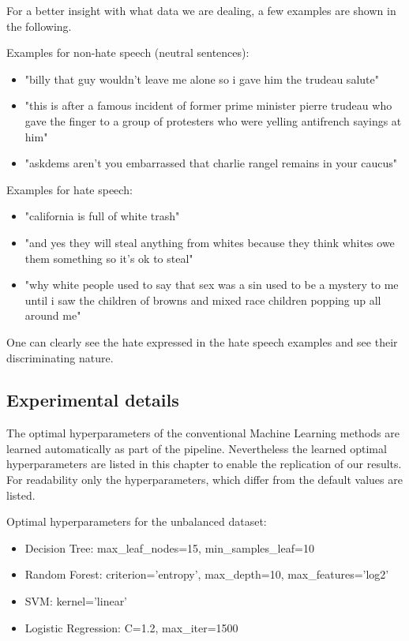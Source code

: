 For a better insight with what data we are dealing, a few examples are shown in the following.

\noindent
Examples for non-hate speech (neutral sentences):
\begin{itemize}
    \item "billy that guy wouldn't leave me alone so i gave him the trudeau salute"
    \item "this is after a famous incident of former prime minister pierre trudeau who gave the finger to a group of protesters who were yelling antifrench sayings at him"
    \item "askdems aren't you embarrassed that charlie rangel remains in your caucus"
\end{itemize}

\noindent
Examples for hate speech:
\begin{itemize}
    \item "california is full of white trash"
    \item "and yes they will steal anything from whites because they think whites owe them something so it's ok to steal"
    \item "why white people used to say that sex was a sin used to be a mystery to me until i saw the children of browns and mixed race children popping up all around me"
\end{itemize}

One can clearly see the hate expressed in the hate speech examples and see their discriminating nature.

\subsection{Experimental details}


The optimal hyperparameters of the conventional Machine Learning methods are learned automatically as part of the pipeline. Nevertheless the learned optimal hyperparameters are listed in this chapter to enable the replication of our results. For readability only the hyperparameters, which differ from the default values are listed.

Optimal hyperparameters for the unbalanced dataset:
\begin{itemize}
	\item Decision Tree: max\_leaf\_nodes=15, min\_samples\_leaf=10
	\item Random Forest: criterion='entropy', max\_depth=10, max\_features='log2'
	\item SVM: kernel='linear'
	\item Logistic Regression: C=1.2, max\_iter=1500
\end{itemize}

